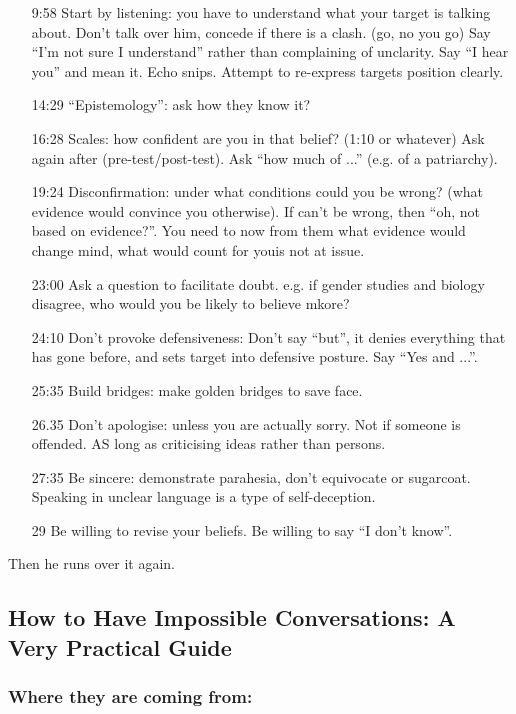 \documentclass[10pt,titlepage]{book}
\begin{document}
\begin{itemize}
\item[9:58] Start by listening: you have to understand what your target is talking about.
  Don't talk over him, concede if there is a clash. (go, no you go)
  Say ``I'm not sure I understand'' rather than complaining of unclarity.
  Say ``I hear you'' and mean it.
  Echo snips.
  Attempt to re-express targets position clearly.
\item[14:29] ``Epistemology'': ask how they know it?
\item[16:28] Scales: how confident are you in that belief? (1:10 or whatever)
  Ask again after (pre-test/post-test).
  Ask ``how much of ...'' (e.g. of a patriarchy).
\item[19:24] Disconfirmation: under what conditions could you be wrong?
  (what evidence would convince you otherwise).
  If can't be wrong, then ``oh, not based on evidence?''.
  You need to now from them what evidence would change mind, what would count for youis not at issue.
\item[23:00] Ask a question to facilitate doubt.
  e.g. if gender studies and biology disagree, who would you be likely to believe mkore?
\item[24:10] Don't provoke defensiveness: Don't say ``but'', it denies everything that has gone before, and sets target into defensive posture.
  Say ``Yes and ...''.
\item[25:35] Build bridges: make golden bridges to save face.
\item[26.35] Don't apologise: unless you are actually sorry. Not if someone is offended.  AS long as criticising ideas rather than persons.
\item[27:35] Be sincere: demonstrate parahesia, don't equivocate or sugarcoat.
  Speaking in unclear language is a type of self-deception.
  \item[29] Be willing to revise your beliefs.  Be willing to say ``I don't know''.
\end{itemize}

Then he runs over it again.

\subsection{How to Have Impossible Conversations: A Very Practical Guide\cite{boghossian-conversations}}

\cite{boghossian-manual}

\subsubsection{Where they are coming from:}
\end{document}

